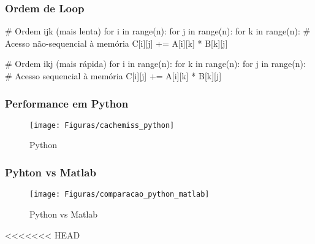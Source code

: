 \documentclass[utf8]{beamer}
\theoremstyle{definition}
\begin{document}
\begin{frame}[fragile]
	\frametitle{Ordem de Loop}
	\begin{semiverbatim}
		# Ordem ijk (mais lenta)
		for i in range(n):
		   for j in range(n):
		      for k in range(n):  # Acesso não-sequencial à memória
		        C[i][j] += A[i][k] * B[k][j]
		
		# Ordem ikj (mais rápida)
		for i in range(n):
		   for k in range(n):
		      for j in range(n):  # Acesso sequencial à memória
		         C[i][j] += A[i][k] * B[k][j]
	\end{semiverbatim}
\end{frame}

\begin{frame}
	\frametitle{Performance em Python}
	\begin{figure}[H]
		\centering
		\texttt{[image: Figuras/cachemiss\_python]}
		\caption{Python}
		\label{fig:performace_python}
	\end{figure}
\end{frame}

\begin{frame}
		\frametitle{Pyhton vs Matlab}
	\begin{figure}[H]
		\centering
		\texttt{[image: Figuras/comparacao\_python\_matlab]}
		\caption{Python vs Matlab}
		\label{fig:performace_python_vs_matlab}
	\end{figure}
\end{frame}

<<<<<<< HEAD
\end{document}
